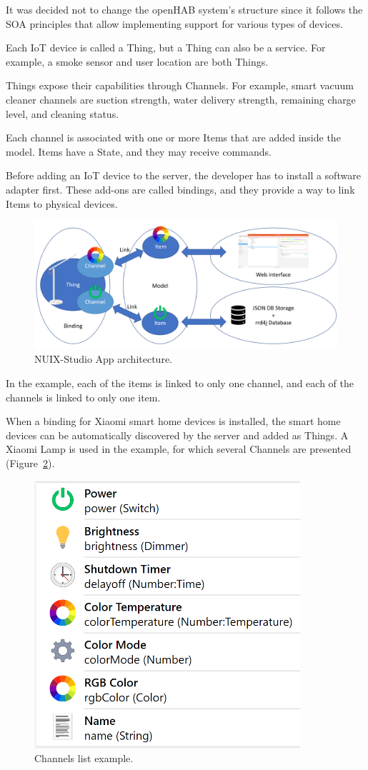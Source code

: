 It was decided not to change the openHAB system's structure since it follows the SOA principles that allow implementing support for various types of devices.

Each IoT device is called a Thing, but a Thing can also be a service. For example, a smoke sensor and user location are both Things.

Things expose their capabilities through Channels. For example, smart vacuum cleaner channels are suction strength, water delivery strength, remaining charge level, and cleaning status. 

Each channel is associated with one or more Items that are added inside the model. Items have a State, and they may receive commands. 

Before adding an IoT device to the server, the developer has to install a software adapter first. These add-ons are called bindings, and they provide a way to link Items to physical devices.

\begin{figure}
  \centering
  \includegraphics[width=0.9\linewidth]{figures/openHABServerStructure.png}
  \caption{NUIX-Studio App architecture.}
  \label{fig:openHABServerStructure-figure}
\end{figure}

In the example, each of the items is linked to only one channel, and each of the channels is linked to only one item. 

When a binding for Xiaomi smart home devices is installed, the smart home devices can be automatically discovered by the server and added as Things. A Xiaomi Lamp is used in the example, for which several Channels are presented (Figure~\ref{fig:XiaomiLampChannels-figure}).

\begin{figure}
  \centering
  \includegraphics[width=0.6\linewidth]{figures/XiaomiLampChannels.png}
  \caption{Channels list example.}
  \label{fig:XiaomiLampChannels-figure}
\end{figure}

